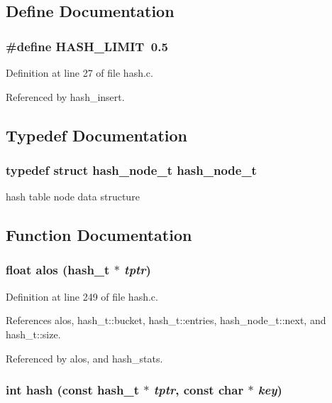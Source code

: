 \subsection{Define Documentation}
\subsubsection{\setlength{\rightskip}{0pt plus 5cm}\#define HASH\_\-LIMIT\ 0.5}\label{hash_8c_a0}




Definition at line 27 of file hash.c.

Referenced by hash\_\-insert.

\subsection{Typedef Documentation}
\subsubsection{\setlength{\rightskip}{0pt plus 5cm}typedef struct hash\_\-node\_\-t  hash\_\-node\_\-t}\label{hash_8c_a1}


hash table node data structure 

\subsection{Function Documentation}
\subsubsection{\setlength{\rightskip}{0pt plus 5cm}float alos ({\bf hash\_\-t} $\ast$ {\em tptr})\hspace{0.3cm}{\tt  [static]}}\label{hash_8c_a9}




Definition at line 249 of file hash.c.

References alos, hash\_\-t::bucket, hash\_\-t::entries, hash\_\-node\_\-t::next, and hash\_\-t::size.

Referenced by alos, and hash\_\-stats.
\subsubsection{\setlength{\rightskip}{0pt plus 5cm}int hash (const {\bf hash\_\-t} $\ast$ {\em tptr}, const char $\ast$ {\em key})\hspace{0.3cm}{\tt  [static]}}\label{hash_8c_a2}




